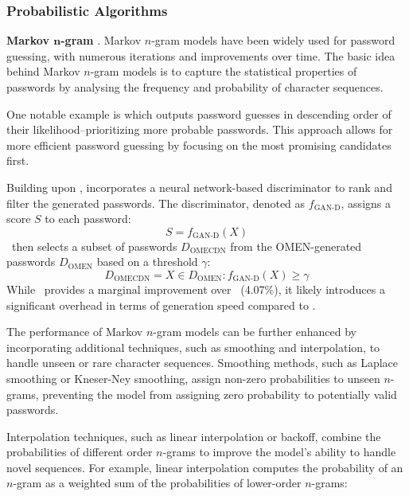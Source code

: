 \subsubsection{Probabilistic Algorithms}

\textbf{Markov $\bm{n}$-gram} \cite{narayanan_fast_2005}. Markov $n$-gram models have been widely used for password guessing, with numerous iterations and improvements over time. The basic idea behind Markov $n$-gram models is to capture the statistical properties of passwords by analysing the frequency and probability of character sequences.

One notable example is \omen which outputs password guesses in descending order of their likelihood--prioritizing more probable passwords. This approach allows for more efficient password guessing by focusing on the most promising candidates first.

Building upon \omen, \omecdn incorporates a neural network-based discriminator to rank and filter the generated passwords. The discriminator, denoted as $f_{\text{GAN-D}}$, assigns a score $S$ to each password:
\begin{equation}
S = f_{\text{GAN-D}}(X)
\end{equation}
\omecdnnocite\ then selects a subset of passwords $D_{\text{OMECDN}}$ from the OMEN-generated passwords $D_{\text{OMEN}}$ based on a threshold $\gamma$:
\begin{equation}
D_{\text{OMECDN}} = { X \in D_{\text{OMEN}} : f_{\text{GAN-D}}(X) \geq \gamma }
\end{equation}
While \omecdnnocite\ provides a marginal improvement over \omennocite\ (4.07\%), it likely introduces a significant overhead in terms of generation speed compared to \omennocite.

The performance of Markov $n$-gram models can be further enhanced by incorporating additional techniques, such as smoothing and interpolation, to handle unseen or rare character sequences. Smoothing methods, such as Laplace smoothing or Kneser-Ney smoothing, assign non-zero probabilities to unseen $n$-grams, preventing the model from assigning zero probability to potentially valid passwords.

Interpolation techniques, such as linear interpolation or backoff, combine the probabilities of different order $n$-grams to improve the model's ability to handle novel sequences. For example, linear interpolation computes the probability of an $n$-gram as a weighted sum of the probabilities of lower-order $n$-grams:

